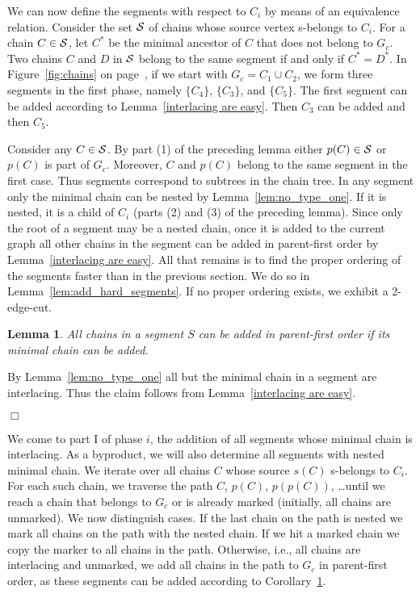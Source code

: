 \documentclass[paper=a4]{scrartcl}
\newtheorem{lemma}{Lemma}
\newcommand{\qed}{}
\newcommand{\mqed}{\hfill$\Box$}
\newlength{\proofpostskipamount}\newlength{\proofpreskipamount}
\newenvironment{proof}{\par\vspace{\proofpreskipamount}\noindent{\textbf{Proof:}}\hspace{0.5em}}{\nopagebreak \strut\nopagebreak \hspace{\fill}\mqed\par\vspace{\proofpostskipamount}\noindent}
\newcommand{\sset}[1]{\{ #1 \}}
\begin{document}
We can now define the segments with respect to $C_i$ by means of an equivalence relation. Consider the set $\cal S$ of chains whose source vertex s-belongs to $C_i$. For a chain $C \in \cal S$, let $C^*$ be the minimal ancestor of $C$ that does not belong to $G_c$. Two chains $C$ and $D$ in $\cal S$ belong to the same segment if and only if $C^* = D^*$. In Figure~\ref{fig:chains} on page~\pageref{fig:chains}, if we start with $G_c = C_1 \cup C_2$, we form three segments in the first phase, namely $\sset{C_4}$, $\sset{C_3}$, and $\sset{C_5}$. The first segment can be added according to Lemma~\ref{interlacing are easy}. Then $C_3$ can be added and then $C_5$.

Consider any $C \in \cal S$. By part (1) of the preceding lemma either $p(C) \in \cal S$ or $p(C)$ is part of $G_c$. Moreover, $C$ and $p(C)$ belong to the same segment in the first case. Thus segments correspond to subtrees in the chain tree. In any segment only the minimal chain can be nested by Lemma~\ref{lem:no_type_one}. If it is nested, it is a child of $C_i$ (parts (2) and (3) of the preceding lemma). Since only the root of a segment may be a nested chain, once it is added to the current graph all other chains in the segment can be added in parent-first order by Lemma~\ref{interlacing are easy}. All that remains is to find the proper ordering of the segments faster than in the previous section. We do so in Lemma~\ref{lem:add_hard_segments}. If no proper ordering exists, we exhibit a 2-edge-cut.








\begin{lemma}\label{cor:add_segment} All chains in a segment $S$ can be added in parent-first order if its minimal chain can be added.
\end{lemma}
\begin{proof} By Lemma~\ref{lem:no_type_one} all but the minimal chain in a segment are interlacing. Thus the claim follows from Lemma~\ref{interlacing are easy}. \qed
\end{proof}

We come to part I of phase $i$, the addition of all segments whose minimal chain is interlacing. As a byproduct, we will also determine all segments with nested minimal chain. We iterate over all chains $C$ whose source $s(C)$ s-belongs to $C_i$. For each such chain, we traverse the path $C$, $p(C)$, $p(p(C))$, \ldots until we reach a chain that belongs to $G_c$ or is already marked (initially, all chains are unmarked). We now distinguish cases. If the last chain on the path is nested we mark all chains on the path with the nested chain. If we hit a marked chain we copy the marker to all chains in the path.  Otherwise, i.e., all chains are interlacing and unmarked, we add all chains in the path to $G_c$ in parent-first order, as these segments can be added according to Corollary~\ref{cor:add_segment}. 
\end{document}
